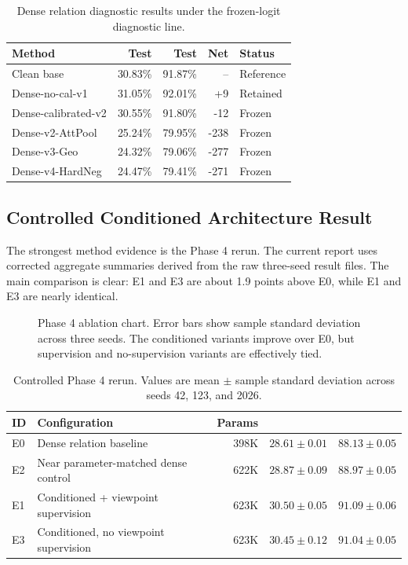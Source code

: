 \begin{table}[!htbp]
\centering
\small
\caption{Dense relation diagnostic results under the frozen-logit diagnostic line.}
\label{tab:dense}
\begin{tabular}{lrrrl}
\toprule
Method & Test \acc{} & Test \acctopfive{} & Net & Status \\
\midrule
Clean base & 30.83\% & 91.87\% & -- & Reference \\
Dense-no-cal-v1 & 31.05\% & 92.01\% & +9 & Retained \\
Dense-calibrated-v2 & 30.55\% & 91.80\% & -12 & Frozen \\
Dense-v2-AttPool & 25.24\% & 79.95\% & -238 & Frozen \\
Dense-v3-Geo & 24.32\% & 79.06\% & -277 & Frozen \\
Dense-v4-HardNeg & 24.47\% & 79.41\% & -271 & Frozen \\
\bottomrule
\end{tabular}
\end{table}

\subsection{Controlled Conditioned Architecture Result}

The strongest method evidence is the Phase 4 rerun. The current report uses corrected aggregate summaries derived from the raw three-seed result files. The main comparison is clear: E1 and E3 are about 1.9 points above E0, while E1 and E3 are nearly identical.

\begin{figure}[!htbp]
  \centering
  
  \caption{Phase 4 ablation chart. Error bars show sample standard deviation across three seeds. The conditioned variants improve over E0, but supervision and no-supervision variants are effectively tied.}
  \label{fig:phase4}
\end{figure}

\begin{table}[!htbp]
\centering
\small
\caption{Controlled Phase 4 rerun. Values are mean $\pm$ sample standard deviation across seeds 42, 123, and 2026.}
\label{tab:phase4}
\begin{tabular}{llrrr}
\toprule
ID & Configuration & Params & \acc{} & \acctopfive{} \\
\midrule
E0 & Dense relation baseline & 398K & $28.61 \pm 0.01$ & $88.13 \pm 0.05$ \\
E2 & Near parameter-matched dense control & 622K & $28.87 \pm 0.09$ & $88.97 \pm 0.05$ \\
E1 & Conditioned + viewpoint supervision & 623K & $30.50 \pm 0.05$ & $91.09 \pm 0.06$ \\
E3 & Conditioned, no viewpoint supervision & 623K & $30.45 \pm 0.12$ & $91.04 \pm 0.05$ \\
\bottomrule
\end{tabular}
\end{table}

